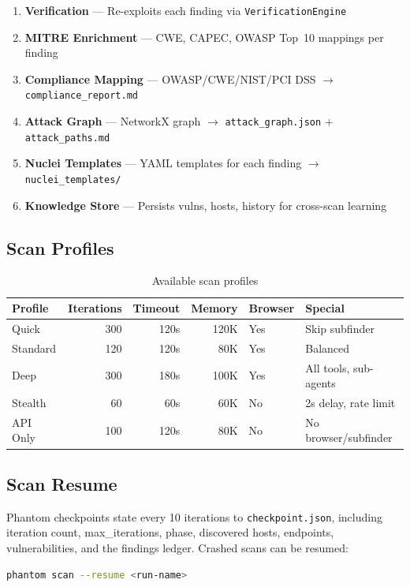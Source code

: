 \documentclass[11pt,a4paper]{article}
\begin{document}
\begin{enumerate}[noitemsep]
  \item \textbf{Verification} --- Re-exploits each finding via \texttt{VerificationEngine}
  \item \textbf{MITRE Enrichment} --- CWE, CAPEC, OWASP Top~10 mappings per finding
  \item \textbf{Compliance Mapping} --- OWASP/CWE/NIST/PCI DSS $\to$ \texttt{compliance\_report.md}
  \item \textbf{Attack Graph} --- NetworkX graph $\to$ \texttt{attack\_graph.json} + \texttt{attack\_paths.md}
  \item \textbf{Nuclei Templates} --- YAML templates for each finding $\to$ \texttt{nuclei\_templates/}
  \item \textbf{Knowledge Store} --- Persists vulns, hosts, history for cross-scan learning
\end{enumerate}

\subsection{Scan Profiles}
\begin{table}[H]
\centering
\caption{Available scan profiles}
\label{tab:profiles}
\begin{tabular}{lrrrll}
\toprule
\textbf{Profile} & \textbf{Iterations} & \textbf{Timeout} & \textbf{Memory} & \textbf{Browser} & \textbf{Special} \\
\midrule
Quick    & 300  & 120s & 120K & Yes & Skip subfinder \\
Standard & 120  & 120s & 80K  & Yes & Balanced \\
Deep     & 300  & 180s & 100K & Yes & All tools, sub-agents \\
Stealth  & 60   & 60s  & 60K  & No  & 2s delay, rate limit \\
API Only & 100  & 120s & 80K  & No  & No browser/subfinder \\
\bottomrule
\end{tabular}
\end{table}

\subsection{Scan Resume}
Phantom checkpoints state every 10 iterations to \texttt{checkpoint.json},
including iteration count, max\_iterations, phase, discovered hosts, endpoints,
vulnerabilities, and the findings ledger. Crashed scans can be resumed:
\begin{lstlisting}[language=bash]
phantom scan --resume <run-name>
\end{lstlisting}
\end{document}
